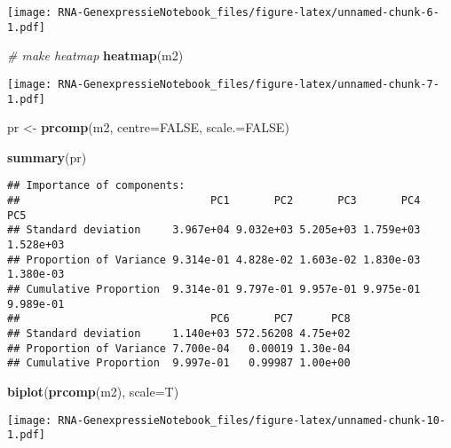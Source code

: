 \documentclass[]{article}
\newenvironment{Shaded}{\begin{snugshade}}{\end{snugshade}}
\newcommand{\KeywordTok}[1]{\textcolor[rgb]{0.13,0.29,0.53}{\textbf{#1}}}
\newcommand{\DataTypeTok}[1]{\textcolor[rgb]{0.13,0.29,0.53}{#1}}
\newcommand{\StringTok}[1]{\textcolor[rgb]{0.31,0.60,0.02}{#1}}
\newcommand{\CommentTok}[1]{\textcolor[rgb]{0.56,0.35,0.01}{\textit{#1}}}
\newcommand{\OtherTok}[1]{\textcolor[rgb]{0.56,0.35,0.01}{#1}}
\newcommand{\NormalTok}[1]{#1}
\begin{document}
\texttt{[image: RNA-GenexpressieNotebook\_files/figure-latex/unnamed-chunk-6-1.pdf]}

\begin{Shaded}
\begin{Highlighting}[]
\CommentTok{# make heatmap}
\KeywordTok{heatmap}\NormalTok{(m2)}
\end{Highlighting}
\end{Shaded}

\texttt{[image: RNA-GenexpressieNotebook\_files/figure-latex/unnamed-chunk-7-1.pdf]}

\begin{Shaded}
\begin{Highlighting}[]
\NormalTok{pr <-}\StringTok{ }\KeywordTok{prcomp}\NormalTok{(m2, }\DataTypeTok{centre=}\OtherTok{FALSE}\NormalTok{, }\DataTypeTok{scale.=}\OtherTok{FALSE}\NormalTok{)}
\end{Highlighting}
\end{Shaded}

\begin{Shaded}
\begin{Highlighting}[]
\KeywordTok{summary}\NormalTok{(pr)}
\end{Highlighting}
\end{Shaded}

\begin{verbatim}
## Importance of components:
##                              PC1       PC2       PC3       PC4       PC5
## Standard deviation     3.967e+04 9.032e+03 5.205e+03 1.759e+03 1.528e+03
## Proportion of Variance 9.314e-01 4.828e-02 1.603e-02 1.830e-03 1.380e-03
## Cumulative Proportion  9.314e-01 9.797e-01 9.957e-01 9.975e-01 9.989e-01
##                              PC6       PC7      PC8
## Standard deviation     1.140e+03 572.56208 4.75e+02
## Proportion of Variance 7.700e-04   0.00019 1.30e-04
## Cumulative Proportion  9.997e-01   0.99987 1.00e+00
\end{verbatim}

\begin{Shaded}
\begin{Highlighting}[]
\KeywordTok{biplot}\NormalTok{(}\KeywordTok{prcomp}\NormalTok{(m2), }\DataTypeTok{scale=}\NormalTok{T)}
\end{Highlighting}
\end{Shaded}

\texttt{[image: RNA-GenexpressieNotebook\_files/figure-latex/unnamed-chunk-10-1.pdf]}
\end{document}
